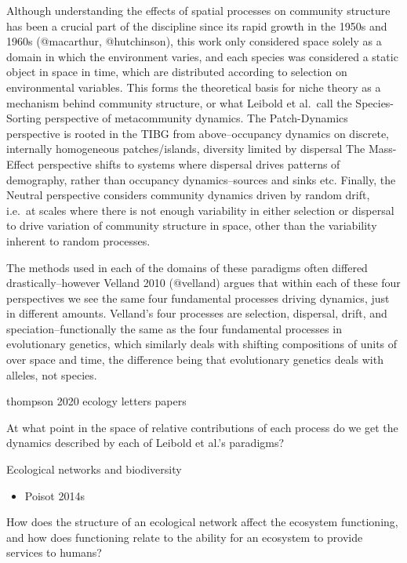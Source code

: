 Although understanding the effects of spatial processes on community
structure has been a crucial part of the discipline since its rapid
growth in the 1950s and 1960s (@macarthur, @hutchinson), this work only
considered space solely as a domain in which the environment varies, and
each species was considered a static object in space in time, which are
distributed according to selection on environmental variables. This
forms the theoretical basis for niche theory as a mechanism behind
community structure, or what Leibold et al.~call the Species-Sorting
perspective of metacommunity dynamics. The Patch-Dynamics perspective is
rooted in the TIBG from above--occupancy dynamics on discrete,
internally homogeneous patches/islands, diversity limited by dispersal
The Mass-Effect perspective shifts to systems where dispersal drives
patterns of demography, rather than occupancy dynamics--sources and
sinks etc. Finally, the Neutral perspective considers community dynamics
driven by random drift, i.e.~at scales where there is not enough
variability in either selection or dispersal to drive variation of
community structure in space, other than the variability inherent to
random processes.

The methods used in each of the domains of these paradigms often
differed drastically--however Velland 2010 (@velland) argues that within
each of these four perspectives we see the same four fundamental
processes driving dynamics, just in different amounts. Velland's four
processes are selection, dispersal, drift, and speciation--functionally
the same as the four fundamental processes in evolutionary genetics,
which similarly deals with shifting compositions of units of over space
and time, the difference being that evolutionary genetics deals with
alleles, not species.

thompson 2020 ecology letters papers

At what point in the space of relative contributions of each process do
we get the dynamics described by each of Leibold et al.'s paradigms?

Ecological networks and biodiversity

\begin{itemize}
\tightlist
\item
  Poisot 2014s
\end{itemize}

How does the structure of an ecological network affect the ecosystem
functioning, and how does functioning relate to the ability for an
ecosystem to provide services to humans?

